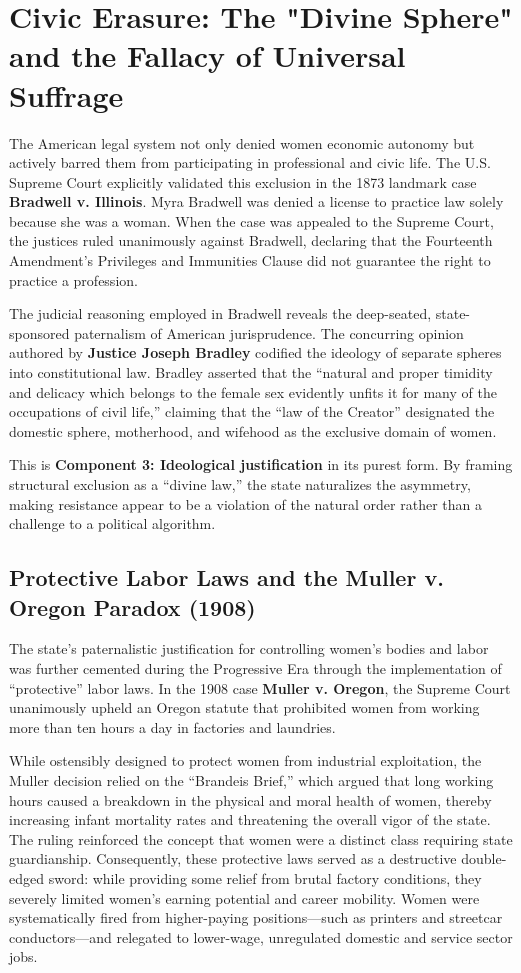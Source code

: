 \documentclass[12pt,openany]{book}
\begin{document}
\section{Civic Erasure: The "Divine Sphere" and the Fallacy of Universal Suffrage}

The American legal system not only denied women economic autonomy but actively barred them from participating in professional and civic life. The U.S. Supreme Court explicitly validated this exclusion in the 1873 landmark case \textbf{Bradwell v. Illinois}. Myra Bradwell was denied a license to practice law solely because she was a woman. When the case was appealed to the Supreme Court, the justices ruled unanimously against Bradwell, declaring that the Fourteenth Amendment’s Privileges and Immunities Clause did not guarantee the right to practice a profession.

The judicial reasoning employed in Bradwell reveals the deep-seated, state-sponsored paternalism of American jurisprudence. The concurring opinion authored by \textbf{Justice Joseph Bradley} codified the ideology of separate spheres into constitutional law. Bradley asserted that the ``natural and proper timidity and delicacy which belongs to the female sex evidently unfits it for many of the occupations of civil life,'' claiming that the ``law of the Creator'' designated the domestic sphere, motherhood, and wifehood as the exclusive domain of women. 

This is \textbf{Component 3: Ideological justification} in its purest form. By framing structural exclusion as a ``divine law,'' the state naturalizes the asymmetry, making resistance appear to be a violation of the natural order rather than a challenge to a political algorithm.

\subsection{Protective Labor Laws and the Muller v. Oregon Paradox (1908)}

The state’s paternalistic justification for controlling women’s bodies and labor was further cemented during the Progressive Era through the implementation of ``protective'' labor laws. In the 1908 case \textbf{Muller v. Oregon}, the Supreme Court unanimously upheld an Oregon statute that prohibited women from working more than ten hours a day in factories and laundries. 

While ostensibly designed to protect women from industrial exploitation, the Muller decision relied on the ``Brandeis Brief,'' which argued that long working hours caused a breakdown in the physical and moral health of women, thereby increasing infant mortality rates and threatening the overall vigor of the state. The ruling reinforced the concept that women were a distinct class requiring state guardianship. Consequently, these protective laws served as a destructive double-edged sword: while providing some relief from brutal factory conditions, they severely limited women's earning potential and career mobility. Women were systematically fired from higher-paying positions---such as printers and streetcar conductors---and relegated to lower-wage, unregulated domestic and service sector jobs.
\end{document}
